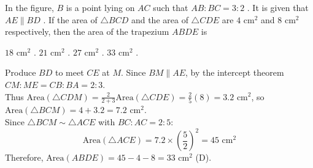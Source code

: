 
\question In the figure, $B$ is a point lying on $AC$ such that $AB : BC = 3 : 2$ . It is given that $AE \parallel BD$ . If the area of $\triangle BCD$ and the area of $\triangle CDE$ are $4\text{ cm}^2$ and $8\text{ cm}^2$ respectively, then the area of the trapezium $ABDE$ is

\begin{minipage}{0.45\textwidth}
\begin{choices}
    \choice $18\text{ cm}^2$ .
    \choice $21\text{ cm}^2$ .
    \choice $27\text{ cm}^2$ .
    \correctchoice $33\text{ cm}^2$ .
\end{choices}
\end{minipage}
\begin{minipage}{0.52\textwidth}
\centering
{}
\end{minipage}
\begin{solution}
Produce $BD$ to meet $CE$ at $M$. Since $BM \parallel AE$, by the intercept theorem $CM : ME = CB : BA = 2 : 3$. \\
Thus $\text{Area}(\triangle CDM) = \frac{2}{2+3}\text{Area}(\triangle CDE) = \frac{2}{5}(8) = 3.2\text{ cm}^2$, so $\text{Area}(\triangle BCM) = 4 + 3.2 = 7.2\text{ cm}^2$. \\
Since $\triangle BCM \sim \triangle ACE$ with $BC : AC = 2 : 5$:
\[ \text{Area}(\triangle ACE) = 7.2 \times \left(\frac{5}{2}\right)^2 = 45\text{ cm}^2 \]
Therefore, $\text{Area}(ABDE) = 45 - 4 - 8 = 33\text{ cm}^2$ (D).
\end{solution}
